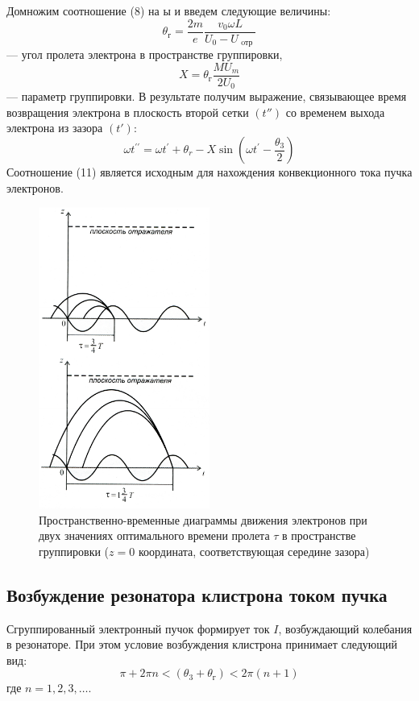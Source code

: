 Домножим соотношение (8) на ы и введем следующие величины:
\begin{equation}
	\theta _ { \text{г} } = \frac { 2 m } { e } \frac { v _ { 0 } \omega L } { U _ { 0 } - U _ { \text{ oтр } } }
\end{equation} — угол пролета электрона в пространстве группировки,
\begin{equation}
	X = \theta _ { \text{г} } \frac{M U _ { m } } { 2 U _ { 0 } }
\end{equation} — параметр группировки. В результате получим выражение, связывающее время возвращения электрона в плоскость второй сетки $(t'' )$ со временем выхода электрона из зазора $(t')$:
\begin{equation}
	\omega t ^ { \prime \prime } = \omega t ^ { \prime } + \theta _ { r } - X \sin \left( \omega t ^ { \prime } - \frac { \theta _ { 3 } } { 2 } \right)
\end{equation}
Соотношение (11) является исходным для нахождения конвекционного тока пучка электронов.

\begin{figure}[h!]
	\centering
	\includegraphics[width=0.5\textwidth]{fig/fig3}
	\caption{Пространственно-временные диаграммы движения электронов при двух значениях оптимального времени пролета $\tau$ в пространстве группировки ($z=0$ координата, соответствующая середине зазора)}
	\label{fig:3}
\end{figure}

\subsection{Возбуждение резонатора клистрона током пучка}
Сгруппированный электронный пучок формирует ток $I$, возбуждающий колебания в резонаторе. При этом условие возбуждения клистрона принимает следующий вид:
\begin{equation}
	\pi + 2 \pi n < \left( \theta _ { 3 } + \theta _ { \text{г} } \right) < 2 \pi ( n + 1 )
\end{equation}где $n=1,2,3,\dots $.

